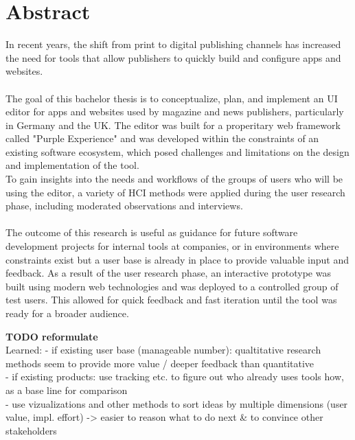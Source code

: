 %

\chapter{Abstract}

In recent years, the shift from print to digital publishing channels has increased the need for tools that allow publishers to quickly build and configure apps and websites.
\\\\
The goal of this bachelor thesis is to conceptualize, plan, and implement an UI editor for apps and websites used by magazine and news publishers, particularly in Germany and the UK.
The editor was built for a properitary web framework called "Purple Experience" and was developed within the constraints of an existing software ecosystem, which posed challenges and limitations on the design and implementation of the tool.
\\
To gain insights into the needs and workflows of the groups of users who will be using the editor, a variety of HCI methods were applied during the user research phase, including moderated observations and interviews. 
\\\\
The outcome of this research is useful as guidance for future software development projects for internal tools at companies, or in environments where constraints exist but a user base is already in place to provide valuable input and feedback. As a result of the user research phase, an interactive prototype was built using modern web technologies and was deployed to a controlled group of test users. This allowed for quick feedback and fast iteration until the tool was ready for a broader audience.

\textbf{TODO reformulate}
\\
Learned: 
- if existing user base (manageable number): qualtitative research methods seem to provide more value / deeper feedback than quantitative
\\
- if existing products: use tracking etc. to figure out who already uses tools how, as a base line for comparison
\\
- use vizualizations and other methods to sort ideas by multiple dimensions (user value, impl. effort) -> easier to reason what to do next \& to convince other stakeholders